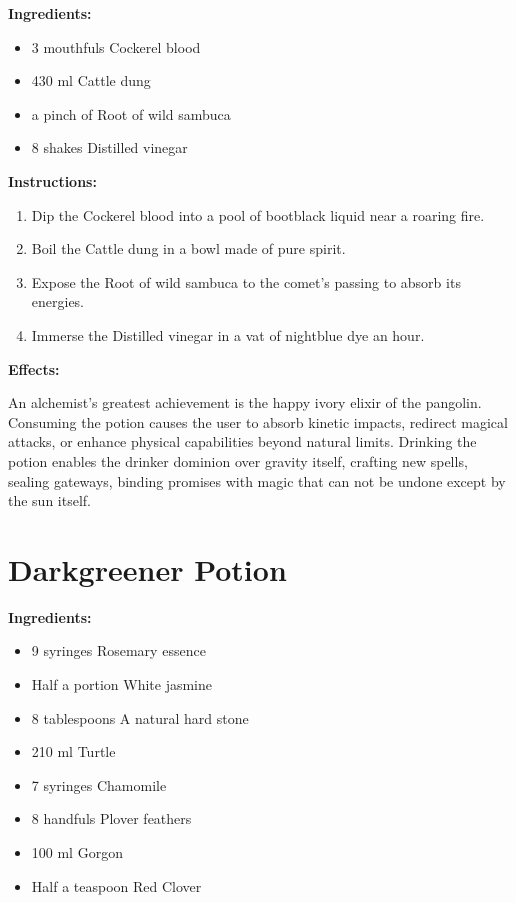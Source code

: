 \documentclass{article}
\begin{document}
\textbf{Ingredients:}

\begin{itemize}
  \item 3 mouthfuls Cockerel blood
  \item 430 ml Cattle dung
  \item a pinch of Root of wild sambuca
  \item 8 shakes Distilled vinegar
\end{itemize}

\textbf{Instructions:}

\begin{enumerate}
  \item Dip the Cockerel blood into a pool of bootblack liquid near a roaring fire.
  \item Boil the Cattle dung in a bowl made of pure spirit.
  \item Expose the Root of wild sambuca to the comet’s passing to absorb its energies.
  \item Immerse the Distilled vinegar in a vat of nightblue dye an hour.
\end{enumerate}

\textbf{Effects:}

An alchemist's greatest achievement is the happy ivory elixir of the pangolin. Consuming the potion causes the user to absorb kinetic impacts, redirect magical attacks, or enhance physical capabilities beyond natural limits. Drinking the potion enables the drinker dominion over gravity itself, crafting new spells, sealing gateways, binding promises with magic that can not be undone except by the sun itself.

\newpage
\section*{Darkgreener Potion}

\textbf{Ingredients:}

\begin{itemize}
  \item 9 syringes Rosemary essence
  \item Half a portion White jasmine
  \item 8 tablespoons A natural hard stone
  \item 210 ml Turtle
  \item 7 syringes Chamomile
  \item 8 handfuls Plover feathers
  \item 100 ml Gorgon
  \item Half a teaspoon Red Clover
\end{itemize}
\end{document}
